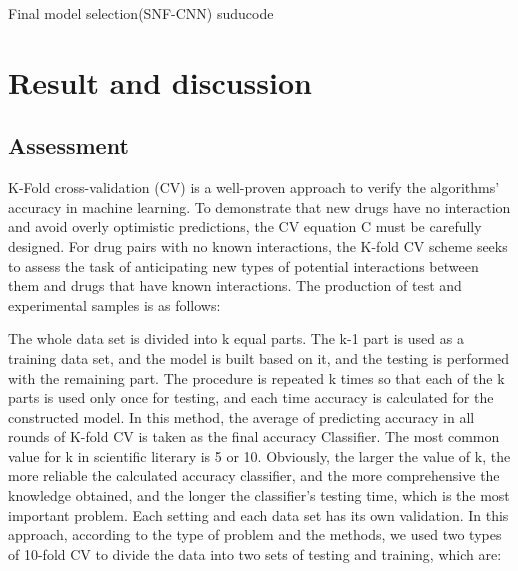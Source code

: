 \documentclass{bmcart}
\begin{document}
\renewcommand{\algorithmicrequire}{\textbf{Input:}}
\renewcommand{\algorithmicensure}{\textbf{Output:}}
\begin{algorithm}[!h]
\caption{Final model selection(SNF-CNN) suducode}
\label{SNFCNNSuducode}
\end{algorithm}


\section*{Result and discussion}
\subsection*{Assessment}
K-Fold cross-validation (CV) is a well-proven approach to verify the algorithms' accuracy in machine learning. To demonstrate that new drugs have no interaction and avoid overly optimistic predictions, the CV equation C must be carefully designed. For drug pairs with no known interactions, the K-fold CV scheme seeks to assess the task of anticipating new types of potential interactions between them and drugs that have known interactions. The production of test and experimental samples is as follows:

The whole data set is divided into k equal parts. The k-1 part is used as a training data set, and the model is built based on it, and the testing is performed with the remaining part. The procedure is repeated k times so that each of the k parts is used only once for testing, and each time accuracy is calculated for the constructed model. In this method, the average of predicting accuracy in all rounds of K-fold CV is taken as the final accuracy Classifier. The most common value for k in scientific literary is 5 or 10. Obviously, the larger the value of k, the more reliable the calculated accuracy classifier, and the more comprehensive the knowledge obtained, and the longer the classifier's testing time, which is the most important problem. Each setting and each data set has its own validation. In this approach, according to the type of problem and the methods, we used two types of 10-fold CV to divide the data into two sets of testing and training, which are:
\end{document}
